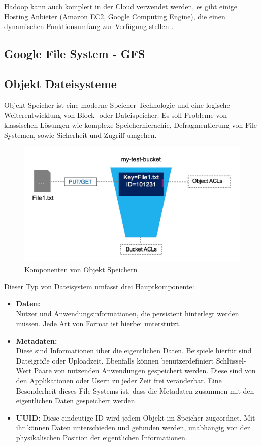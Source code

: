 Hadoop kann auch komplett in der Cloud verwendet werden, es gibt einige Hosting Anbieter (Amazon EC2, Google Computing Engine), die einen dynamischen Funktionsumfang zur Verfügung stellen \parencite[Kap. I, 1]{alapati.2016}.

\subsection{Google File System - GFS} 
\subsection{Objekt Dateisysteme} \label{subsec:objectstorage}

Objekt Speicher ist eine moderne Speicher Technologie und eine logische Weiterentwicklung von Block- oder Dateispeicher. Es soll Probleme von klassischen Lösungen wie komplexe Speicherhierachie, Defragmentierung von File Systemen, sowie Sicherheit und Zugriff umgehen.

\begin{figure}[hbt]
	\centering
	\includegraphics[scale=0.4]{images/object-storage}
	\caption{Komponenten von Objekt Speichern \parencite[S. 5]{Rios.2017}}
	\label{fig:objectstorage}
\end{figure}

Dieser Typ von Dateisystem umfasst drei Hauptkomponente:

\begin{itemize}
	\item \textbf{Daten:}\\
	 Nutzer und Anwendungsinformationen, die persistent hinterlegt werden müssen. Jede Art von Format ist hierbei unterstützt.
	\item \textbf{Metadaten:}\\
	 Diese sind Informationen über die eigentlichen Daten. Beispiele hierfür sind Dateigröße oder Uploadzeit. Ebenfalls können benutzerdefiniert Schlüssel-Wert Paare von nutzenden Anwendungen gespeichert werden. Diese sind von den Applikationen oder Usern zu jeder Zeit frei veränderbar. Eine Besonderheit dieses File Systems ist, dass die Metadaten zusammen mit den eigentlichen Daten gespeichert werden.
	\item \textbf{\ac{UUID}:} Diese eindeutige ID wird jedem Objekt im Speicher zugeordnet. Mit ihr können Daten unterschieden  und gefunden werden, unabhängig von der physikalischen Position der eigentlichen Informationen.
\end{itemize}

